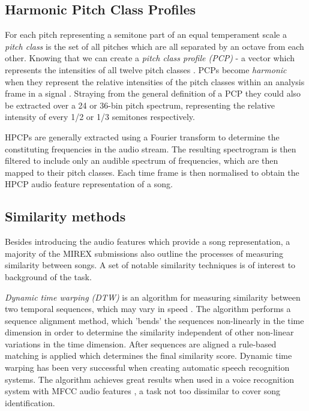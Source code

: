 \subsection{Harmonic Pitch Class Profiles}
\label{subsec:hpcp}

For each pitch representing a semitone part of an equal temperament scale a
\textit{pitch class} is the set of all pitches which are all separated by an
octave from each other. Knowing that we can create a \textit{pitch class profile
(PCP)} - a vector which represents the intensities of all twelve pitch classes
\cite{fujishima1999real}. PCPs become \textit{harmonic} when they represent the
relative intensities of the pitch classes within an analysis frame in a signal
\cite{wiki:hpcp}. Straying from the general definition of a PCP they could also
be extracted over a 24 or 36-bin pitch spectrum, representing the relative
intensity of every 1/2 or 1/3 semitones respectively.

HPCPs are generally extracted using a Fourier transform to determine the
constituting frequencies in the audio stream. The resulting spectrogram is then
filtered to include only an audible spectrum of frequencies, which are then
mapped to their pitch classes. Each time frame is then normalised to obtain the
HPCP audio feature representation of a song.

\subsection{Similarity methods}
\label{subsec:simmethods}
Besides introducing the audio features which provide a song representation, a
majority of the MIREX submissions also outline the processes of measuring
similarity between songs. A set of notable similarity techniques is of interest
to background of the task. 

\textit{Dynamic time warping (DTW)} is an algorithm for measuring similarity
between two temporal sequences, which may vary in speed \cite{wiki:dtw}. The
algorithm performs a sequence alignment method, which 'bends' the sequences
non-linearly in the time dimension in order to determine the similarity
independent of other non-linear variations in the time dimension. After
sequences are aligned a rule-based matching is applied which determines the
final similarity score. Dynamic time warping has been very successful when
creating automatic speech recognition systems. The algorithm achieves great
results when used in a voice recognition system with MFCC audio features
\cite{muda2010voice}, a task not too dissimilar to cover song identification.

